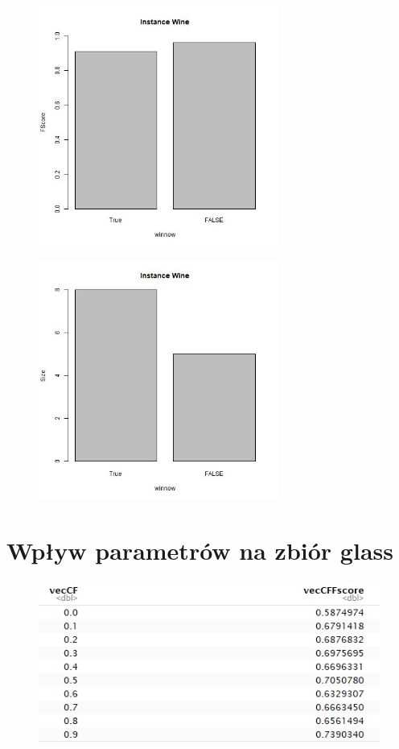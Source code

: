 \documentclass[12pt,a4paper]{article}
\begin{document}
\begin{figure}[H]
\centering
\includegraphics[width=0.7\textwidth]{WineFScoreWinnow.jpg}
\end{figure}

\begin{figure}[H]
\centering
\includegraphics[width=0.7\textwidth]{WineSizeWinnow.jpg}
\end{figure}

\section{Wpływ parametrów na zbiór glass}

\begin{figure}[H]
\centering
\includegraphics{glassDTCF.PNG}
\end{figure}
\end{document}
